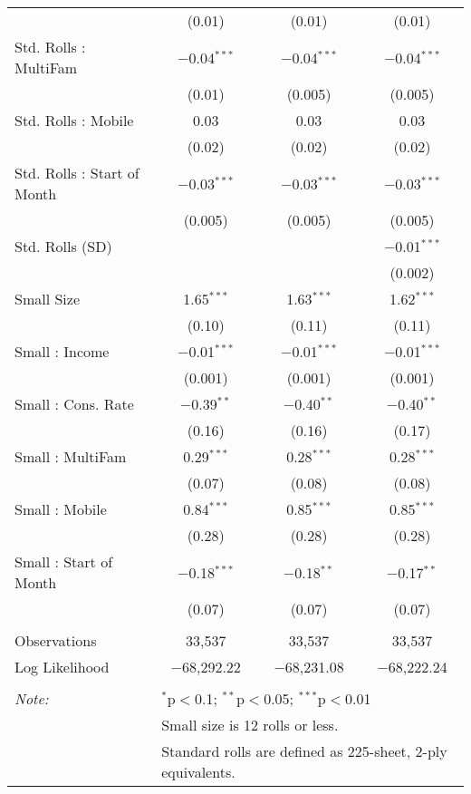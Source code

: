 \begin{table}[!htbp]
\begin{tabular}{@{\extracolsep{5pt}}lccc}
  & (0.01) & (0.01) & (0.01) \\ 
  Std. Rolls : MultiFam & $-$0.04$^{***}$ & $-$0.04$^{***}$ & $-$0.04$^{***}$ \\ 
  & (0.01) & (0.005) & (0.005) \\ 
  Std. Rolls : Mobile & 0.03 & 0.03 & 0.03 \\ 
  & (0.02) & (0.02) & (0.02) \\ 
  Std. Rolls : Start of Month & $-$0.03$^{***}$ & $-$0.03$^{***}$ & $-$0.03$^{***}$ \\ 
  & (0.005) & (0.005) & (0.005) \\ 
  Std. Rolls (SD) &  &  & $-$0.01$^{***}$ \\ 
  &  &  & (0.002) \\ 
  Small Size & 1.65$^{***}$ & 1.63$^{***}$ & 1.62$^{***}$ \\ 
  & (0.10) & (0.11) & (0.11) \\ 
  Small : Income & $-$0.01$^{***}$ & $-$0.01$^{***}$ & $-$0.01$^{***}$ \\ 
  & (0.001) & (0.001) & (0.001) \\ 
  Small : Cons. Rate & $-$0.39$^{**}$ & $-$0.40$^{**}$ & $-$0.40$^{**}$ \\ 
  & (0.16) & (0.16) & (0.17) \\ 
  Small : MultiFam & 0.29$^{***}$ & 0.28$^{***}$ & 0.28$^{***}$ \\ 
  & (0.07) & (0.08) & (0.08) \\ 
  Small : Mobile & 0.84$^{***}$ & 0.85$^{***}$ & 0.85$^{***}$ \\ 
  & (0.28) & (0.28) & (0.28) \\ 
  Small : Start of Month & $-$0.18$^{***}$ & $-$0.18$^{**}$ & $-$0.17$^{**}$ \\ 
  & (0.07) & (0.07) & (0.07) \\ 
 \hline \\[-1.8ex] 
Observations & 33,537 & 33,537 & 33,537 \\ 
Log Likelihood & $-$68,292.22 & $-$68,231.08 & $-$68,222.24 \\ 
\hline 
\hline \\[-1.8ex] 
\textit{Note:}  & \multicolumn{3}{l}{$^{*}$p$<$0.1; $^{**}$p$<$0.05; $^{***}$p$<$0.01} \\ 
 & \multicolumn{3}{l}{Small size is 12 rolls or less.} \\ 
 & \multicolumn{3}{l}{Standard rolls are defined as 225-sheet, 2-ply equivalents.} \\ 
\end{tabular} 
\end{table} 
